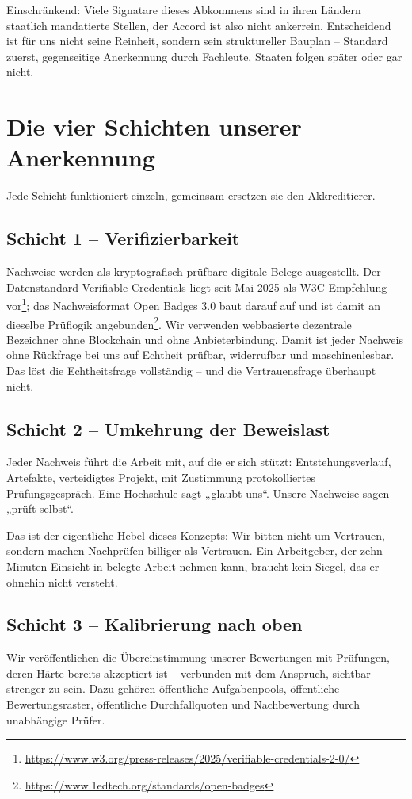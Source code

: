 \documentclass[11pt,a4paper]{article}
\begin{document}
Einschränkend: Viele Signatare dieses Abkommens sind in ihren Ländern staatlich mandatierte Stellen, der Accord ist also nicht ankerrein. Entscheidend ist für uns nicht seine Reinheit, sondern sein struktureller Bauplan -- Standard zuerst, gegenseitige Anerkennung durch Fachleute, Staaten folgen später oder gar nicht.

\section{Die vier Schichten unserer Anerkennung}
Jede Schicht funktioniert einzeln, gemeinsam ersetzen sie den Akkreditierer.

\subsection{Schicht 1 -- Verifizierbarkeit}
Nachweise werden als kryptografisch prüfbare digitale Belege ausgestellt. Der Datenstandard Verifiable Credentials liegt seit Mai 2025 als W3C-Empfehlung vor\footnote{\url{https://www.w3.org/press-releases/2025/verifiable-credentials-2-0/}}; das Nachweisformat Open Badges 3.0 baut darauf auf und ist damit an dieselbe Prüflogik angebunden\footnote{\url{https://www.1edtech.org/standards/open-badges}}. Wir verwenden webbasierte dezentrale Bezeichner ohne Blockchain und ohne Anbieterbindung. Damit ist jeder Nachweis ohne Rückfrage bei uns auf Echtheit prüfbar, widerrufbar und maschinenlesbar. Das löst die Echtheitsfrage vollständig -- und die Vertrauensfrage überhaupt nicht.

\subsection{Schicht 2 -- Umkehrung der Beweislast}
Jeder Nachweis führt die Arbeit mit, auf die er sich stützt: Entstehungsverlauf, Artefakte, verteidigtes Projekt, mit Zustimmung protokolliertes Prüfungsgespräch. Eine Hochschule sagt „glaubt uns“. Unsere Nachweise sagen „prüft selbst“.

Das ist der eigentliche Hebel dieses Konzepts: Wir bitten nicht um Vertrauen, sondern machen Nachprüfen billiger als Vertrauen. Ein Arbeitgeber, der zehn Minuten Einsicht in belegte Arbeit nehmen kann, braucht kein Siegel, das er ohnehin nicht versteht.

\subsection{Schicht 3 -- Kalibrierung nach oben}
Wir veröffentlichen die Übereinstimmung unserer Bewertungen mit Prüfungen, deren Härte bereits akzeptiert ist -- verbunden mit dem Anspruch, sichtbar strenger zu sein. Dazu gehören öffentliche Aufgabenpools, öffentliche Bewertungsraster, öffentliche Durchfallquoten und Nachbewertung durch unabhängige Prüfer.
\end{document}
